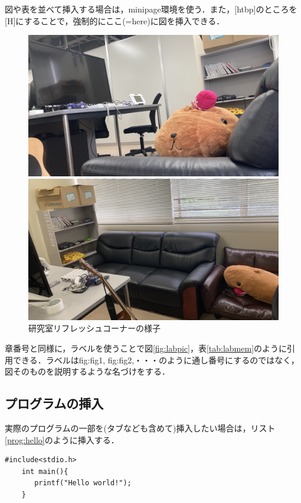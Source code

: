 図や表を並べて挿入する場合は，minipage環境を使う．また，[htbp]のところを[H]にすることで，強制的にここ(=here)に図を挿入できる．
\begin{figure}[H]
	\begin{minipage}{.5\textwidth}
        \centering
		\includegraphics[width=.95\textwidth]{figure/labpic_game.jpg}
	\end{minipage}\hfill
 	\begin{minipage}{.5\textwidth}
        \centering
		\includegraphics[width=.95\textwidth]{figure/labpic_sofa.jpg}
	\end{minipage}\hfill
	\caption{研究室リフレッシュコーナーの様子}\label{fig:labpic_ref}
\end{figure}

章番号と同様に，ラベルを使うことで図\ref{fig:labpic}，表\ref{tab:labmem}のように引用できる．ラベルはfig:fig1, fig:fig2,・・・のように通し番号にするのではなく，図そのものを説明するような名づけをする．

\subsection{プログラムの挿入}\label{sec:program}
実際のプログラムの一部を(タブなども含めて)挿入したい場合は，リスト\ref{prog:hello}のように挿入する．
\begin{lstlisting}[caption=C言語で"Hello world!"を出力するプログラム,label=prog:hello]
    #include<stdio.h>
    int main(){
       printf("Hello world!");
    }
\end{lstlisting}

